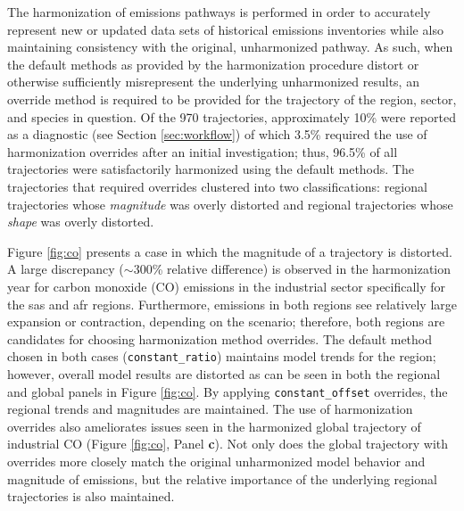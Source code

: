 \documentclass[review]{elsarticle}
\newcommand{\code}[1]{\lstinline[basicstyle=\ttfamily\color{black}]|#1|}
\begin{document}
The harmonization of emissions pathways is performed in order to accurately
represent new or updated data sets of historical emissions inventories while also
maintaining consistency with the original, unharmonized pathway. As such, when
the default methods as provided by the harmonization procedure distort or
otherwise sufficiently misrepresent the underlying unharmonized results, an
override method is required to be provided for the trajectory of the region,
sector, and species in question. Of the 970 trajectories, approximately 10\%
were reported as a diagnostic (see Section \ref{sec:workflow}) of which 3.5\%
required the use of harmonization overrides after an initial investigation;
thus, 96.5\% of all trajectories were satisfactorily harmonized using the
default methods. The trajectories that required overrides clustered into two
classifications: regional trajectories whose \textit{magnitude} was overly
distorted and regional trajectories whose \textit{shape} was overly distorted.

Figure \ref{fig:co} presents a case in which the magnitude of a trajectory is
distorted. A large discrepancy ($\sim$300\% relative difference) is observed in
the harmonization year for carbon monoxide (CO) emissions in the industrial
sector specifically for the \gls{sas} and \gls{afr} regions. Furthermore,
emissions in both regions see relatively large expansion or contraction,
depending on the scenario; therefore, both regions are candidates for choosing
harmonization method overrides. The default method chosen in both cases
(\code{constant_ratio}) maintains model trends for the region; however, overall
model results are distorted as can be seen in both the regional and global
panels in Figure \ref{fig:co}. By applying \code{constant_offset} overrides, the
regional trends and magnitudes are maintained. The use of harmonization
overrides also ameliorates issues seen in the harmonized global trajectory of
industrial CO (Figure \ref{fig:co}, Panel \textbf{c}). Not only does the global
trajectory with overrides more closely match the original unharmonized model
behavior and magnitude of emissions, but the relative importance of the
underlying regional trajectories is also maintained.
\end{document}
